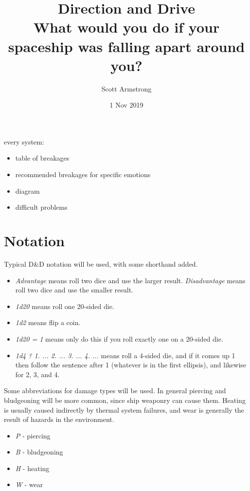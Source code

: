 \documentclass[a4paper]{article}
\title{Direction and Drive \\ {\large What would you do if your spaceship was falling apart around you?}}
\author{Scott Armstrong}
\date{1 Nov 2019}
\begin{document}
\maketitle

\begin{abstract}

\end{abstract}

\tableofcontents

every system:
\begin{itemize}
\item table of breakages 
\item recommended breakages for specific emotions
\item diagram
\item difficult problems
\end{itemize}

\section{Notation} \label{notation}
Typical D\&D notation will be used, with some shorthand added. 
\begin{itemize}
\item \textit{Advantage} means roll two dice and use the larger result. \textit{Disadvantage} means roll two dice and use the smaller result.
\item \textit{1d20} means roll one 20-sided die.
\item \textit{1d2} means flip a coin.
\item \textit{1d20 = 1} means only do this if you roll exactly one on a 20-sided die.
\item \textit{1d4 ? 1. ... 2. ... 3. ... 4. ...} means roll a 4-sided die, and if it comes up 1 then follow the sentence after 1 (whatever is in the first ellipsis), and likewise for 2, 3, and 4.
\end{itemize}

\hspace{-18pt} Some abbreviations for damage types will be used. In general piercing and bludgeoning will be more common, since ship weaponry can cause them. Heating is usually caused indirectly by thermal system failures, and wear is generally the result of hazards in the environment.
\begin{itemize}
\item \textit{P} - piercing
\item \textit{B} - bludgeoning
\item \textit{H} - heating
\item \textit{W} - wear
\end{itemize}
\end{document}
